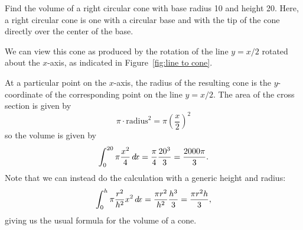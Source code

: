 \documentclass{ximera}
\begin{document}
\begin{example}
Find the volume of a right circular cone with base radius 10 and
height 20. Here, a right circular cone is one with a circular base and
with the tip of the cone directly over the center of the base.

\begin{image}
\end{image}

We can view this cone as produced by the rotation of the line
$y=x/2$ rotated about the $x$-axis, as indicated in
Figure~\ref{fig:line to cone}.

At a particular point on the $x$-axis, the radius of the resulting
cone is the $y$-coordinate of the corresponding point on the line
$y=x/2$. The area of the cross section is given by
\[
\pi \cdot \text{radius}^2 = \pi \left(\frac{x}{2}\right)^2
\]
so the volume is given by
$$
  \int_0^{20} \pi
  {x^2\over4}\mathop{}\!d\! x={\pi\over4}{20^3\over3}={2000\pi\over3}.
$$ 
Note that we can instead do the calculation with a generic height and
radius: 
\[
  \int_0^{h} \pi{r^2\over h^2}x^2\mathop{}\!d\! x
  ={\pi r^2\over h^2}{h^3\over3}={\pi r^2h\over3},
\]
giving us the usual formula for the volume of a cone.
\end{example}
\end{document}
